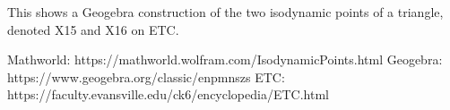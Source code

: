 This shows a Geogebra construction of the two isodynamic points of a triangle, denoted X15 and X16 on ETC.

Mathworld: https://mathworld.wolfram.com/IsodynamicPoints.html
Geogebra: https://www.geogebra.org/classic/enpmnszs
ETC: https://faculty.evansville.edu/ck6/encyclopedia/ETC.html